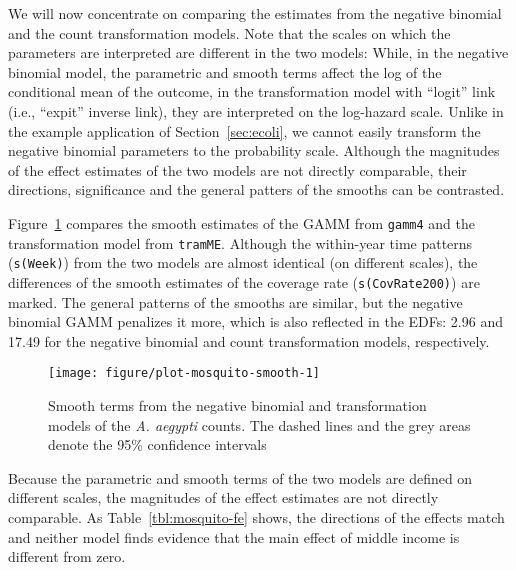 \documentclass[11pt]{article}\usepackage[]{graphicx}\usepackage{xcolor}
\newenvironment{knitrout}{}{} %
\newcommand{\pkg}[1]{\texttt{#1}}
\newcommand{\0}{{\mathbf{0}}}
\begin{document}
We will now concentrate on comparing the estimates
from the negative binomial and the count transformation models.
Note that the scales on which the parameters are interpreted
are different in the two models:
While, in the negative binomial model,
the parametric and smooth terms affect
the log of the conditional mean of the outcome,
in the transformation model with ``logit'' link
(i.e., ``expit'' inverse link),
they are interpreted on the log-hazard scale.
Unlike in the example application of Section~\ref{sec:ecoli},
we cannot easily transform the negative binomial parameters
to the probability scale.
Although the magnitudes of the effect estimates
of the two models are not directly comparable,
their directions, significance
and the general patters of the smooths can be contrasted.

Figure~\ref{fig:mosquito-smooth} compares the smooth estimates
of the GAMM from \pkg{gamm4}
and the transformation model from \pkg{tramME}.
Although the within-year time patterns (\texttt{s(Week)})
from the two models are almost identical
(on different scales),
the differences of the smooth estimates of the coverage rate
(\texttt{s(CovRate200)}) are marked.
The general patterns of the smooths are similar,
but the negative binomial GAMM penalizes it more,
which is also reflected in the EDFs:
2.96
and 17.49
for the negative binomial and count transformation models,
respectively.

\begin{figure}[!ht]
  \centering

\begin{knitrout}\small
{}\color{fgcolor}
\texttt{[image: figure/plot-mosquito-smooth-1]} 
\end{knitrout}

\caption{Smooth terms from the negative binomial and transformation models
  of the \emph{A. aegypti} counts.
  The dashed lines and the grey areas denote
  the 95\% confidence intervals}\label{fig:mosquito-smooth}
\end{figure}

Because the parametric and smooth terms
of the two models are defined on different scales,
the magnitudes of the effect estimates are not directly comparable.
As Table~\ref{tbl:mosquito-fe} shows,
the directions of the effects match
and neither model finds evidence that the main effect
of middle income is different from zero.
\end{document}
